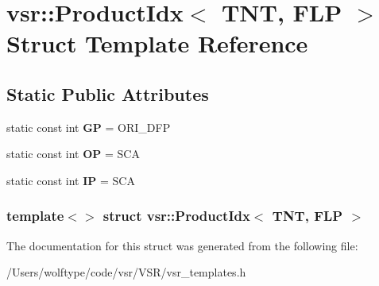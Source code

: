 \hypertarget{structvsr_1_1_product_idx_3_01_t_n_t_00_01_f_l_p_01_4}{\section{vsr\-:\-:Product\-Idx$<$ T\-N\-T, F\-L\-P $>$ Struct Template Reference}
\label{structvsr_1_1_product_idx_3_01_t_n_t_00_01_f_l_p_01_4}
}
\subsection*{Static Public Attributes}
\begin{DoxyCompactItemize}
\item 
\hypertarget{structvsr_1_1_product_idx_3_01_t_n_t_00_01_f_l_p_01_4_aa145e3327f016490ac1f4222a0dea5ea}{static const int {\bfseries G\-P} = O\-R\-I\-\_\-\-D\-F\-P}\label{structvsr_1_1_product_idx_3_01_t_n_t_00_01_f_l_p_01_4_aa145e3327f016490ac1f4222a0dea5ea}

\item 
\hypertarget{structvsr_1_1_product_idx_3_01_t_n_t_00_01_f_l_p_01_4_aac3193f21c633349161abd4fcfbf781c}{static const int {\bfseries O\-P} = S\-C\-A}\label{structvsr_1_1_product_idx_3_01_t_n_t_00_01_f_l_p_01_4_aac3193f21c633349161abd4fcfbf781c}

\item 
\hypertarget{structvsr_1_1_product_idx_3_01_t_n_t_00_01_f_l_p_01_4_af499f0e09d07e5312e6c2dfa935b828d}{static const int {\bfseries I\-P} = S\-C\-A}\label{structvsr_1_1_product_idx_3_01_t_n_t_00_01_f_l_p_01_4_af499f0e09d07e5312e6c2dfa935b828d}

\end{DoxyCompactItemize}
\subsubsection*{template$<$$>$ struct vsr\-::\-Product\-Idx$<$ T\-N\-T, F\-L\-P $>$}



The documentation for this struct was generated from the following file\-:\begin{DoxyCompactItemize}
\item 
/\-Users/wolftype/code/vsr/\-V\-S\-R/vsr\-\_\-templates.\-h\end{DoxyCompactItemize}
